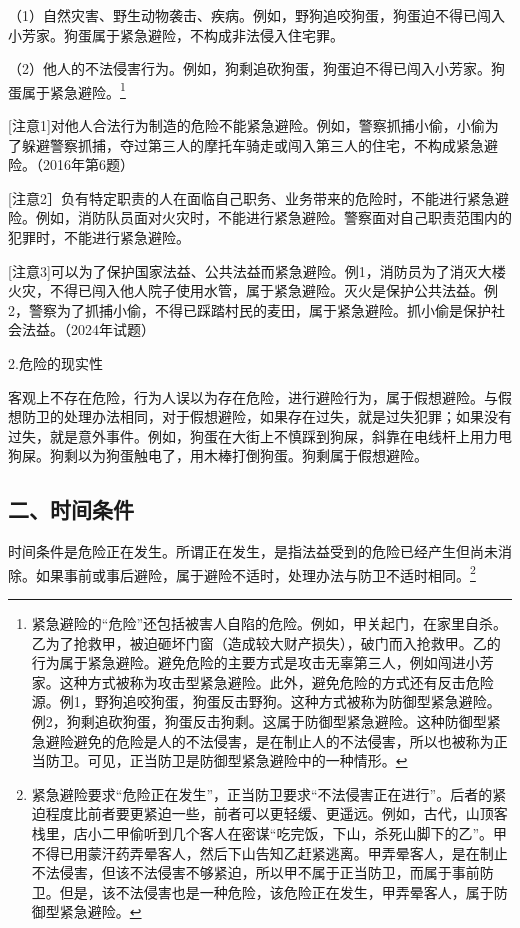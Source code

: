 （1）自然灾害、野生动物袭击、疾病。例如，野狗追咬狗蛋，狗蛋迫不得已闯入小芳家。狗蛋属于紧急避险，不构成非法侵入住宅罪。

（2）他人的不法侵害行为。例如，狗剩追砍狗蛋，狗蛋迫不得已闯入小芳家。狗蛋属于紧急避险。\footnote{紧急避险的“危险”还包括被害人自陷的危险。例如，甲关起门，在家里自杀。乙为了抢救甲，被迫砸坏门窗（造成较大财产损失），破门而入抢救甲。乙的行为属于紧急避险。避免危险的主要方式是攻击无辜第三人，例如闯进小芳家。这种方式被称为攻击型紧急避险。此外，避免危险的方式还有反击危险源。例1，野狗追咬狗蛋，狗蛋反击野狗。这种方式被称为防御型紧急避险。例2，狗剩追砍狗蛋，狗蛋反击狗剩。这属于防御型紧急避险。这种防御型紧急避险避免的危险是人的不法侵害，是在制止人的不法侵害，所以也被称为正当防卫。可见，正当防卫是防御型紧急避险中的一种情形。}

[注意1]对他人合法行为制造的危险不能紧急避险。例如，警察抓捕小偷，小偷为了躲避警察抓捕，夺过第三人的摩托车骑走或闯入第三人的住宅，不构成紧急避险。（2016年第6题）

[注意2］负有特定职责的人在面临自己职务、业务带来的危险时，不能进行紧急避险。例如，消防队员面对火灾时，不能进行紧急避险。警察面对自己职责范围内的犯罪时，不能进行紧急避险。

[注意3]可以为了保护国家法益、公共法益而紧急避险。例1，消防员为了消灭大楼火灾，不得已闯入他人院子使用水管，属于紧急避险。灭火是保护公共法益。例2，警察为了抓捕小偷，不得已踩踏村民的麦田，属于紧急避险。抓小偷是保护社会法益。（2024年试题）

2.危险的现实性

客观上不存在危险，行为人误以为存在危险，进行避险行为，属于假想避险。与假想防卫的处理办法相同，对于假想避险，如果存在过失，就是过失犯罪；如果没有过失，就是意外事件。例如，狗蛋在大街上不慎踩到狗屎，斜靠在电线杆上用力甩狗屎。狗剩以为狗蛋触电了，用木棒打倒狗蛋。狗剩属于假想避险。

\subsection*{二、时间条件}

时间条件是危险正在发生。所谓正在发生，是指法益受到的危险已经产生但尚未消除。如果事前或事后避险，属于避险不适时，处理办法与防卫不适时相同。\footnote{紧急避险要求“危险正在发生”，正当防卫要求“不法侵害正在进行”。后者的紧迫程度比前者要更紧迫一些，前者可以更轻缓、更遥远。例如，古代，山顶客栈里，店小二甲偷听到几个客人在密谋“吃完饭，下山，杀死山脚下的乙”。甲不得已用蒙汗药弄晕客人，然后下山告知乙赶紧逃离。甲弄晕客人，是在制止不法侵害，但该不法侵害不够紧迫，所以甲不属于正当防卫，而属于事前防卫。但是，该不法侵害也是一种危险，该危险正在发生，甲弄晕客人，属于防御型紧急避险。}

